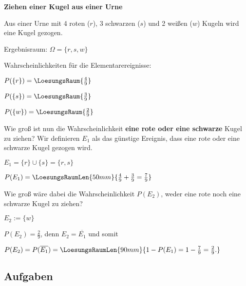 
\begin{beispiel}{}{}\textbf{Ziehen einer Kugel aus einer Urne}

Aus einer Urne mit 4 roten ($r$), 3 schwarzen ($s$) und 2 weißen ($w$) Kugeln wird eine Kugel gezogen.

Ergebnisraum: $\Omega = \{r, s, w\}$


Wahrscheinlichkeiten für die Elementarereignisse:

\noTRAINER{\leserluft\leserluft\leserluft}
$P(\{r\}) = \LoesungsRaum{\frac49}$

\noTRAINER{\leserluft\leserluft\leserluft}
$P(\{s\}) = \LoesungsRaum{\frac39}$

\noTRAINER{\leserluft\leserluft\leserluft}
$P(\{w\}) = \LoesungsRaum{\frac29}$

Wie groß ist nun die Wahrscheinlichkeit \textbf{eine rote oder eine schwarze} Kugel zu ziehen?
Wir definieren $E_1$ als das günstige Ereignis, dass eine rote oder eine schwarze Kugel gezogen wird.

$E_1 = \{r\} \cup \{s\} = \{r,s\}$

\noTRAINER{\leserluft\leserluft\leserluft}
$P(E_1) = \LoesungsRaumLen{50mm}{\frac49 + \frac39 = \frac79}$


Wie groß wäre dabei die Wahrscheinlichkeit $P(E_2)$, weder eine rote noch eine schwarze Kugel zu ziehen?

$E_2 := \{w\}$

$P(E_2) = \frac29$, denn $E_2 = \overline{E_1}$ und somit

\noTRAINER{\leserluft\leserluft}
$P(E_2) = P(\overline{E_1}) = \LoesungsRaumLen{90mm}{1 - P(E_1) = 1 - \frac79 = \frac29 . }$

\end{beispiel}
\newpage

\subsection*{Aufgaben}


